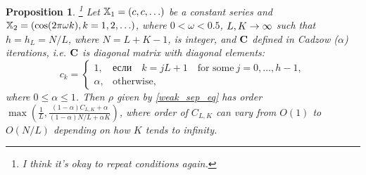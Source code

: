 \documentclass[sii]{ipart}
\newtheorem{proposition}{Proposition}
\begin{document}
\begin{proposition}
	\label{prop:separ1} \footnote{I think it's okay to repeat conditions again.}
	Let $\mathbb{X}_1 = (c, c, \ldots)$ be a constant series and $\mathbb{X}_2 = (\cos(2 \pi \omega k), k = 1, 2, \ldots)$, where $0<\omega <0.5$, $L,K\rightarrow \infty$ such that $h = h_L = N/L$, where $N=L+K-1$, is integer, and $\mathbf{C}$ defined in Cadzow ($\alpha$) iterations, i.e.  $\mathbf{C}$ is diagonal matrix with diagonal elements:
	\begin{equation*}
	c_k = \begin{cases}
	1, & \text{если} \quad k = jL+1 \quad \text{for some} \ j = 0, \ldots, h-1,\\
	\alpha, & \text{otherwise},
	\end{cases}
	\end{equation*}
	where $0 \le \alpha \le 1$. Then $\rho$ given by \eqref{weak_sep_eq} has order $\max(\frac{1}{L}, \frac{(1-\alpha)C_{L,K}+\alpha}{(1-\alpha)N/L+\alpha K})$, where order of $C_{L,K}$
	can vary from $O(1)$ to $O(N/L)$ depending on how $K$ tends to infinity.
\end{proposition}
\end{document}
